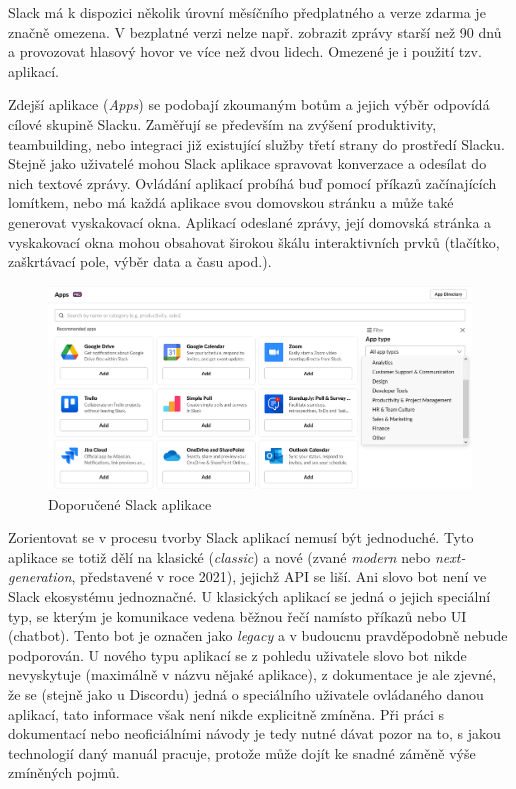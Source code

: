 \documentclass[FM]{tulthesis}
\begin{document}
	Slack má k dispozici několik úrovní měsíčního předplatného a verze zdarma je značně omezena. V bezplatné verzi nelze např. zobrazit zprávy starší než 90 dnů a provozovat hlasový hovor ve více než dvou lidech. Omezené je i použití tzv. aplikací.
	
	Zdejší aplikace (\textit{Apps}) se podobají zkoumaným botům a jejich výběr odpovídá cílové skupině Slacku. Zaměřují se především na zvýšení produktivity, \mbox{teambuilding}, nebo integraci již existující služby třetí strany do prostředí Slacku. Stejně jako uživatelé mohou Slack aplikace spravovat konverzace a odesílat do nich textové zprávy. Ovládání aplikací probíhá buď pomocí příkazů začínajících lomítkem, nebo má každá aplikace svou domovskou stránku a může také generovat vyskakovací okna. Aplikací odeslané zprávy, její domovská stránka a vyskakovací okna mohou obsahovat širokou škálu interaktivních prvků (tlačítko, zaškrtávací pole, výběr data a času apod.).
	
	\begin{figure}[ht]
		\centering
		\includegraphics[width=\textwidth]{img/SlackApps}
		\caption{Doporučené Slack aplikace}
	\end{figure}
	
	Zorientovat se v procesu tvorby Slack aplikací nemusí být jednoduché. Tyto aplikace se totiž dělí na klasické (\textit{classic}) a nové (zvané \textit{modern} nebo \textit{next-generation}, představené v roce 2021), jejichž API se liší. Ani slovo bot není ve Slack ekosystému jednoznačné. U klasických aplikací se jedná o jejich speciální typ, se kterým je komunikace vedena běžnou řečí namísto příkazů nebo UI (chatbot). Tento bot je označen jako \textit{legacy} a v budoucnu pravděpodobně nebude podporován. U nového typu aplikací se z pohledu uživatele slovo bot nikde nevyskytuje (maximálně v názvu nějaké aplikace), z dokumentace je ale zjevné, že se (stejně jako u Discordu) jedná o speciálního uživatele ovládaného danou aplikací, tato informace však není nikde explicitně zmíněna. Při práci s dokumentací nebo neoficiálními návody je tedy nutné dávat pozor na to, s jakou technologií daný manuál pracuje, protože může dojít ke snadné záměně výše zmíněných pojmů.
	
\end{document}
